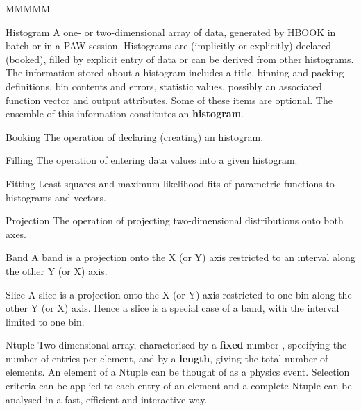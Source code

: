 \begin{DL}{MMMMM}
\item[Histogram] A one- or two-dimensional array of data, generated
                 by HBOOK in batch or in a PAW session. Histograms are (implicitly or
                 explicitly) declared (booked), filled by explicit entry of data
                 or can be derived from other histograms. The information stored
                 about a histogram includes a title, binning and packing definitions,
                 bin contents and errors, statistic values, possibly an
                 associated function vector and output attributes.
                 Some of these items are optional.
                 The ensemble of this information constitutes an {\bf histogram}.
\item[Booking]   The operation of declaring (creating) an histogram.
\item[Filling]   The operation of entering data values into a given histogram.
\item[Fitting]   Least squares and maximum likelihood fits of
                 parametric functions to histograms and vectors.
\item[Projection]The operation of projecting two-dimensional
                 distributions onto both axes.
\item[Band]      A band is a projection onto the X (or Y) axis
                 restricted to an interval
                 along the other Y (or X) axis.
\item[Slice]     A slice is a projection onto the X (or Y) 
                 axis restricted to one bin
                 along the other Y (or X) axis.
                 Hence a slice is a special case of a band, with
                 the interval limited to one bin.
\item[Ntuple]    Two-dimensional array, characterised by a
                 {\bf fixed} number , 
                 specifying the number of entries per element,
                 and by a {\bf length}, giving the
                 total number of elements. 
                 An element of a Ntuple can be thought of
                 as a physics event.
                 Selection criteria can be applied to each entry of an element and
                 a complete Ntuple can be analysed in a fast, efficient
                 and interactive way.

\end{DL}
